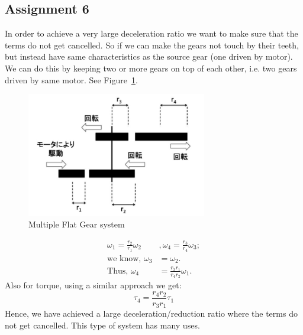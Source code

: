 \documentclass[12pt,a4paper]{report}
\begin{document}
\subsection{\textbf{Assignment 6}}
In order to achieve a very large deceleration ratio we want to make sure that the terms do not get cancelled. 
So if we can make the gears not touch by their teeth, but instead have same characteristics as the source gear (one driven by 
motor). We can do this by keeping two or more gears on top of each other, i.e. two gears driven by same motor. 
See Figure~\ref{fig:ass6}.\\
\begin{figure}
            \centering
    \includegraphics[width=0.7\textwidth]{figures/ass6.jpg}
    \caption{Multiple Flat Gear system}
    \label{fig:ass6}
\end{figure}
\begin{align}
    \omega_1=\frac{r_2}{r_1}\omega_2 &, \omega_4=\frac{r_3}{r_4}\omega_3;\\
    \text{we know, } \omega_3&=\omega_2.\\
    \text{Thus, } \omega_4&=\frac{r_3r_1}{r_4r_2}\omega_1.
\end{align}
Also for torque, using a similar approach we get:
\begin{equation}
    \tau_4=\frac{r_4r_2}{r_3r_1}\tau_1
\end{equation}
Hence, we have achieved a large deceleration/reduction ratio where the terms do not get cancelled. 
This type of system has many uses. 
\end{document}
